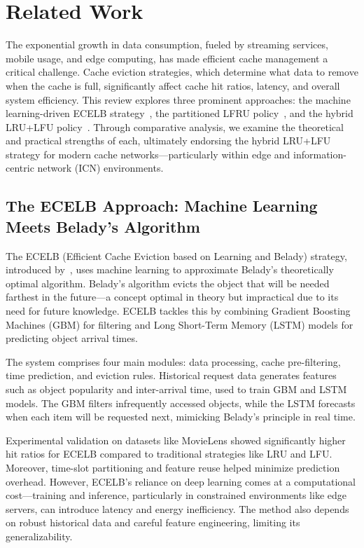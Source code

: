

\section{Related Work}

The exponential growth in data consumption, fueled by streaming services, mobile usage, and edge computing, has made efficient cache management a critical challenge. 
Cache eviction strategies, which determine what data to remove when the cache is full, significantly affect cache hit ratios, latency, and overall system efficiency. 
This review explores three prominent approaches: the machine learning-driven ECELB strategy~\cite{Zhou2023CacheEviction-LearningBeladyAlgorithm}, the partitioned LFRU policy~\cite{Bilal2017CacheManagementSchemeforEfficientContentEvictionReplication}, and the hybrid LRU+LFU policy~\cite{shah2023ImprovedCacheEviction}. 
Through comparative analysis, we examine the theoretical and practical strengths of each, ultimately endorsing the hybrid LRU+LFU strategy for modern cache networks—particularly within edge and information-centric network (ICN) environments.

\subsection{The ECELB Approach: Machine Learning Meets Belady’s Algorithm}

The ECELB (Efficient Cache Eviction based on Learning and Belady) strategy, introduced by~\cite{Zhou2023CacheEviction-LearningBeladyAlgorithm}, uses machine learning to approximate Belady’s theoretically optimal algorithm. 
Belady’s algorithm evicts the object that will be needed farthest in the future—a concept optimal in theory but impractical due to its need for future knowledge. 
ECELB tackles this by combining Gradient Boosting Machines (GBM) for filtering and Long Short-Term Memory (LSTM) models for predicting object arrival times.

The system comprises four main modules: data processing, cache pre-filtering, time prediction, and eviction rules. Historical request data generates features such as object popularity and inter-arrival time, used to train GBM and LSTM models. The GBM filters infrequently accessed objects, while the LSTM forecasts when each item will be requested next, mimicking Belady’s principle in real time.

Experimental validation on datasets like MovieLens showed significantly higher hit ratios for ECELB compared to traditional strategies like LRU and LFU. Moreover, time-slot partitioning and feature reuse helped minimize prediction overhead. However, ECELB’s reliance on deep learning comes at a computational cost—training and inference, particularly in constrained environments like edge servers, can introduce latency and energy inefficiency. The method also depends on robust historical data and careful feature engineering, limiting its generalizability.

